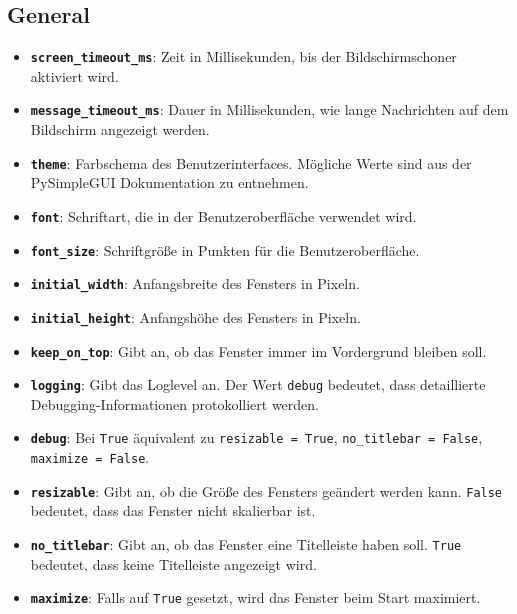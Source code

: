\documentclass[12pt]{article}
\begin{document}
{\subsection{General}
\begin{itemize}
    \item \textbf{\texttt{screen\_timeout\_ms}}: Zeit in Millisekunden, bis der Bildschirmschoner aktiviert wird.
    \item \textbf{\texttt{message\_timeout\_ms}}: Dauer in Millisekunden, wie lange Nachrichten auf dem Bildschirm angezeigt werden.
    \item \textbf{\texttt{theme}}: Farbschema des Benutzerinterfaces. Mögliche Werte sind aus der PySimpleGUI Dokumentation zu entnehmen. \cite{ThemesPySimpleGUIDocumentationc}
    \item \textbf{\texttt{font}}: Schriftart, die in der Benutzeroberfläche verwendet wird.
    \item \textbf{\texttt{font\_size}}: Schriftgröße in Punkten für die Benutzeroberfläche.
    \item \textbf{\texttt{initial\_width}}: Anfangsbreite des Fensters in Pixeln.
    \item \textbf{\texttt{initial\_height}}: Anfangshöhe des Fensters in Pixeln.
    \item \textbf{\texttt{keep\_on\_top}}: Gibt an, ob das Fenster immer im Vordergrund bleiben soll.
    \item \textbf{\texttt{logging}}: Gibt das Loglevel an. Der Wert \texttt{debug} bedeutet, dass detaillierte Debugging-Informationen protokolliert werden.
    \item \textbf{\texttt{debug}}: Bei \texttt{True} äquivalent zu \texttt{resizable = True}, \texttt{no\_titlebar = False}, \texttt{maximize = False}.
    \item \textbf{\texttt{resizable}}: Gibt an, ob die Größe des Fensters geändert werden kann. \texttt{False} bedeutet, dass das Fenster nicht skalierbar ist.
    \item \textbf{\texttt{no\_titlebar}}: Gibt an, ob das Fenster eine Titelleiste haben soll. \texttt{True} bedeutet, dass keine Titelleiste angezeigt wird.
    \item \textbf{\texttt{maximize}}: Falls auf \texttt{True} gesetzt, wird das Fenster beim Start maximiert.
\end{itemize}

}
\end{document}
